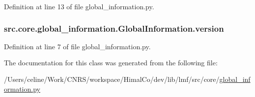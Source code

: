 Definition at line 13 of file global\+\_\+information.\+py.

\hypertarget{classsrc_1_1core_1_1global__information_1_1_global_information_a48a0e9271d030e4d1b1f89aa7f8ecf39}{
\subsubsection[{version}]{\setlength{\rightskip}{0pt plus 5cm}src.\+core.\+global\+\_\+information.\+Global\+Information.\+version}}\label{classsrc_1_1core_1_1global__information_1_1_global_information_a48a0e9271d030e4d1b1f89aa7f8ecf39}


Definition at line 7 of file global\+\_\+information.\+py.



The documentation for this class was generated from the following file\+:\begin{DoxyCompactItemize}
\item 
/\+Users/celine/\+Work/\+C\+N\+R\+S/workspace/\+Himal\+Co/dev/lib/lmf/src/core/\hyperlink{global__information_8py}{global\+\_\+information.\+py}\end{DoxyCompactItemize}

